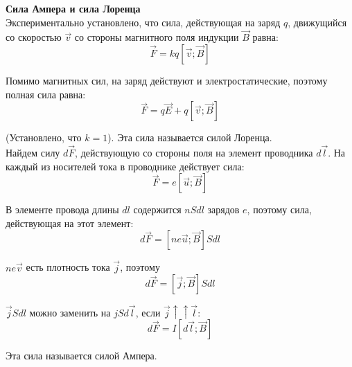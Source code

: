 \documentclass{article}
\begin{document}
	
	\textbf{Сила Ампера и сила Лоренца}\\

	Экспериментально установлено, что сила, действующая на заряд $q$, движущийся со скоростью $\vec v$ со стороны магнитного поля индукции $\vec B$ равна:
	\begin{equation}
		\vec F = kq[\vec v;\vec B]
	\end{equation}

	Помимо магнитных сил, на заряд действуют и электростатические, поэтому полная сила равна:
	\begin{equation}
		\vec F = q\vec E + q[\vec v;\vec B]
	\end{equation}

	(Установлено, что $k=1$). Эта сила называется силой Лоренца.\\

	Найдем силу $d\vec F$, действующую со стороны поля на элемент проводника $d\vec l$. На каждый из носителей тока в проводнике действует сила:
	\begin{equation}
		\vec F = e[\vec u;\vec B]
	\end{equation}

	В элементе провода длины $dl$ содержится $nSdl$ зарядов $e$, поэтому сила, действующая на этот элемент:
	\begin{equation}
		d\vec F = [ne\vec u;\vec B]Sdl
	\end{equation} 

	$ne\vec v$ есть плотность тока $\vec j$, поэтому
	\begin{equation}
		d\vec F = [\vec j;\vec B]Sdl
	\end{equation}

	$\vec jSdl$ можно заменить на $jSd\vec l$, если $\vec j \uparrow\uparrow \vec l$:
	\begin{equation}
		d\vec F = I[d\vec l;\vec B]
	\end{equation}

	Эта сила называется силой Ампера.
\end{document}
